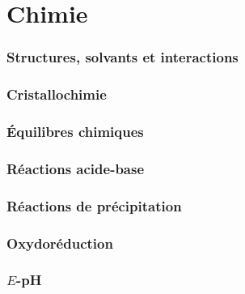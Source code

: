 \setcounter{part}{11}  %

\part{Chimie}

\section{Structures, solvants et interactions}










\section{Cristallochimie}


\section{\'Equilibres chimiques}


\section{Réactions acide-base}






\section{Réactions de précipitation}






\section{Oxydoréduction}




\section{$E$-pH}





